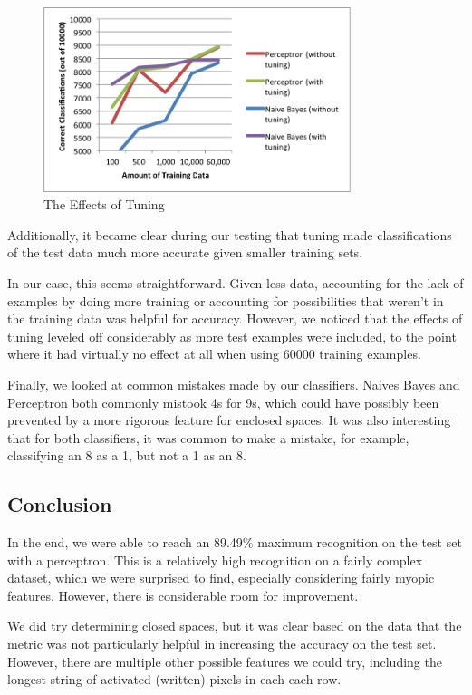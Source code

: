 \documentclass{article}
\theoremstyle{remark}
\begin{document}
    \begin{figure}[h!]
      \centering
      \includegraphics[width=0.8\textwidth]{../graphs/tuning.png}
      \caption{The Effects of Tuning}
    \end{figure}
    \newpage
    Additionally, it became clear during our testing that tuning made classifications of the test data much more accurate given smaller training sets.

    In our case, this seems straightforward. Given less data, accounting for the lack of examples by doing more training or accounting for possibilities that weren't in the training data was helpful for accuracy. However, we noticed that the effects of tuning leveled off considerably as more test examples were included, to the point where it had virtually no effect at all when using 60000 training examples.
    
    Finally, we looked at common mistakes made by our classifiers. Naives Bayes and Perceptron both commonly mistook 4s for 9s, which could have possibly been prevented by a more rigorous feature for enclosed spaces. It was also interesting that for both classifiers, it was common to make a mistake, for example, classifying an 8 as a 1, but not a 1 as an 8.
     \subsection*{Conclusion}
     In the end, we were able to reach an 89.49\% maximum recognition on the test set with a perceptron. This is a relatively high recognition on a fairly complex dataset, which we were surprised to find, especially considering fairly myopic features. However, there is considerable room for improvement.

     We did try determining closed spaces, but it was clear based on the data that the metric was not particularly helpful in increasing the accuracy on the test set. However, there are multiple other possible features we could try, including the longest string of activated (written) pixels in each each row.
\end{document}
